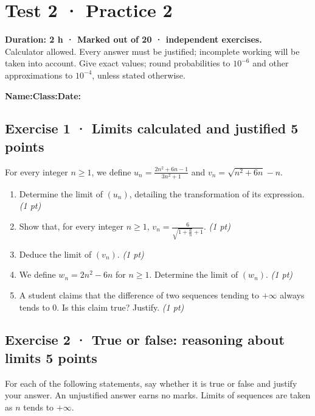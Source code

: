 \fi

\mxnewpage{}\label{sujet:2-2}

\section*{Test 2 · Practice 2}


\textbf{Duration: 2 h · Marked out of 20 ·  independent exercises.}\\Calculator allowed. Every answer must be justified; incomplete working will be taken into account. Give exact values; round probabilities to $10^{-6}$ and other approximations to $10^{-4}$, unless stated otherwise.

\smallskip\textbf{Name:}\enspace\dotfill\quad\textbf{Class:}\enspace\dotfill\quad\textbf{Date:}\enspace\dotfill

\subsection*{Exercise 1 · Limits calculated and justified \hfill 5 points}For every integer $n\ge1$, we define $u_n=\frac{2n^2+6n-1}{3n^2+1}$ and $v_n=\sqrt{n^2+6n}-n$.

\begin{enumerate}

\item Determine the limit of $(u_n)$, detailing the transformation of its expression. \hfill\textit{(1 pt)}

\item Show that, for every integer $n\ge1$, $v_n=\frac{6}{\sqrt{1+\frac{6}n}+1}$. \hfill\textit{(1 pt)}

\item Deduce the limit of $(v_n)$. \hfill\textit{(1 pt)}

\item We define $w_n=2n^2-6n$ for $n\ge1$. Determine the limit of $(w_n)$. \hfill\textit{(1 pt)}

\item A student claims that the difference of two sequences tending to $+\infty$ always tends to $0$. Is this claim true? Justify. \hfill\textit{(1 pt)}

\end{enumerate}

\subsection*{Exercise 2 · True or false: reasoning about limits \hfill 5 points}For each of the following statements, say whether it is true or false and justify your answer. An unjustified answer earns no marks. Limits of sequences are taken as $n$ tends to $+\infty$.

